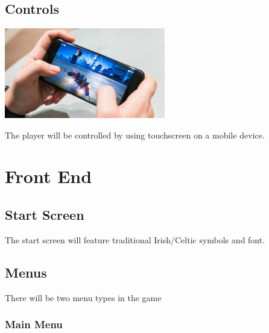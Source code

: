 \documentclass[a4paper]{scrreprt}
\begin{document}
\section{Controls}

\begin{center}
\includegraphics[width=7cm]{mobile}
\end{center}

The player will be controlled by using touchscreen on a mobile device.

\chapter{Front End}

\section{Start Screen}

The start screen will feature traditional Irish/Celtic symbols and font.

\section{Menus}

There will be two menu types in the game

\subsection{Main Menu}
\end{document}
